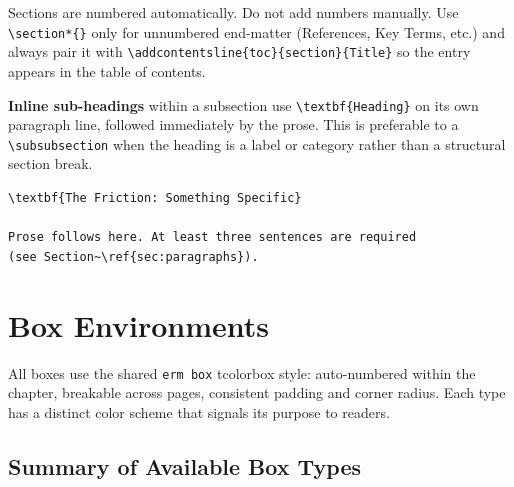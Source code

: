 \documentclass[11pt,openany]{book}
\newcommand{\code}[1]{\texttt{\small #1}}
\begin{document}
Sections are numbered automatically. Do not add numbers manually. Use \code{\textbackslash section*\{\}} only for unnumbered end-matter (References, Key Terms, etc.) and always pair it with \code{\textbackslash addcontentsline\{toc\}\{section\}\{Title\}} so the entry appears in the table of contents.

\textbf{Inline sub-headings} within a subsection use \code{\textbackslash textbf\{Heading\}} on its own paragraph line, followed immediately by the prose. This is preferable to a \code{\textbackslash subsubsection} when the heading is a label or category rather than a structural section break.

\begin{lstlisting}
\textbf{The Friction: Something Specific}

Prose follows here. At least three sentences are required
(see Section~\ref{sec:paragraphs}).
\end{lstlisting}


\section{Box Environments}
\label{sec:boxes}

All boxes use the shared \code{erm box} tcolorbox style: auto-numbered within the chapter, breakable across pages, consistent padding and corner radius. Each type has a distinct color scheme that signals its purpose to readers.

\subsection{Summary of Available Box Types}
\end{document}
